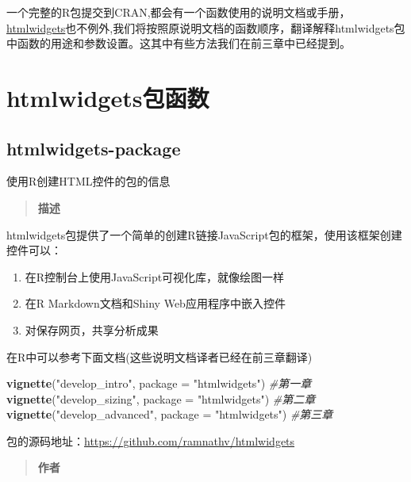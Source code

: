 \documentclass[]{book}
\newenvironment{Shaded}{\begin{snugshade}}{\end{snugshade}}
\newcommand{\KeywordTok}[1]{\textcolor[rgb]{0.13,0.29,0.53}{\textbf{#1}}}
\newcommand{\DataTypeTok}[1]{\textcolor[rgb]{0.13,0.29,0.53}{#1}}
\newcommand{\StringTok}[1]{\textcolor[rgb]{0.31,0.60,0.02}{#1}}
\newcommand{\CommentTok}[1]{\textcolor[rgb]{0.56,0.35,0.01}{\textit{#1}}}
\newcommand{\NormalTok}[1]{#1}
\theoremstyle{definition}
\theoremstyle{definition}
\theoremstyle{definition}
\theoremstyle{remark}
\begin{document}
一个完整的R包提交到CRAN,都会有一个函数使用的说明文档或手册，\href{https://cran.r-project.org/web/packages/htmlwidgets/htmlwidgets.pdf}{htmlwidgets}也不例外,我们将按照原说明文档的函数顺序，翻译解释htmlwidgets包中函数的用途和参数设置。这其中有些方法我们在前三章中已经提到。

\section{htmlwidgets包函数}\label{htmlwidgets}

\subsection{htmlwidgets-package}\label{htmlwidgets-package}

使用R创建HTML控件的包的信息

\begin{quote}
\textbf{描述}
\end{quote}

htmlwidgets包提供了一个简单的创建R链接JavaScript包的框架，使用该框架创建控件可以：

\begin{enumerate}
\def\labelenumi{\arabic{enumi}.}
\item
  在R控制台上使用JavaScript可视化库，就像绘图一样
\item
  在R Markdown文档和Shiny Web应用程序中嵌入控件
\item
  对保存网页，共享分析成果
\end{enumerate}

在R中可以参考下面文档(这些说明文档译者已经在前三章翻译)

\begin{Shaded}
\begin{Highlighting}[]
\KeywordTok{vignette}\NormalTok{(}\StringTok{"develop_intro"}\NormalTok{, }\DataTypeTok{package =} \StringTok{"htmlwidgets"}\NormalTok{) }\CommentTok{#第一章}
\KeywordTok{vignette}\NormalTok{(}\StringTok{"develop_sizing"}\NormalTok{, }\DataTypeTok{package =} \StringTok{"htmlwidgets"}\NormalTok{) }\CommentTok{#第二章}
\KeywordTok{vignette}\NormalTok{(}\StringTok{"develop_advanced"}\NormalTok{, }\DataTypeTok{package =} \StringTok{"htmlwidgets"}\NormalTok{) }\CommentTok{#第三章}
\end{Highlighting}
\end{Shaded}

包的源码地址：\url{https://github.com/ramnathv/htmlwidgets}

\begin{quote}
\textbf{作者}
\end{quote}
\end{document}
